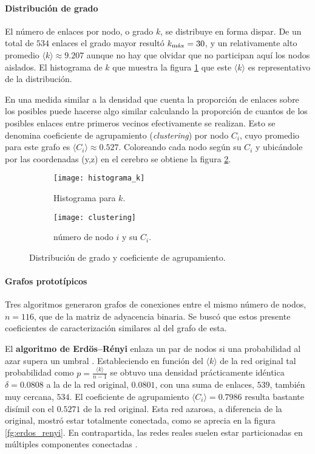 \documentclass{article}
\begin{document}
\paragraph{Distribución de grado}
El número de enlaces por nodo, o grado $k$, se distribuye en forma dispar.
De un total de $534$ enlaces el grado mayor resultó $k_\textnormal{máx} = 30$, y un relativamente alto promedio $\langle k \rangle \approx 9.207$ aunque no hay que olvidar que no participan aquí los nodos aislados.
El histograma de $k$ que muestra la figura \ref{fg:hist_k} que este $\langle k \rangle$ es representativo de la distribución.

En una medida similar a la densidad que cuenta la proporción de enlaces sobre los posibles puede hacerse algo similar calculando la proporción de cuantos de los posibles enlaces entre primeros vecinos efectivamente se realizan.
Esto se denomina coeficiente de agrupamiento (\emph{clustering}) por nodo $C_i$, cuyo promedio para este grafo es $\langle C_i \rangle \approx 0.527$. 
Coloreando cada nodo según su $C_i$ y ubicándole por las coordenadas (y,z) en el cerebro se obtiene la figura \ref{fg:clustering}. 

\begin{figure}[ht]
	\centering
	\begin{subfigure}[b]{0.25\textwidth}
		\texttt{[image: histograma\_k]}
		\caption{Histograma para $k$.
		}
		\label{fg:hist_k}
	\end{subfigure}
	\begin{subfigure}[b]{0.7\textwidth}
		\texttt{[image: clustering]}
		\caption{número de nodo $i$ y su $C_i$.
		}
		\label{fg:clustering}
	\end{subfigure}
	\caption{Distribución de grado y coeficiente de agrupamiento.
	}
	\label{fg:distribución_de_grado}
\end{figure}


\paragraph{Grafos prototípicos}
Tres algoritmos generaron grafos de conexiones entre el mismo número de nodos, $n = 116$, que de la matriz de adyacencia binaria.
Se buscó que estos presente coeficientes de caracterización similares al del grafo de esta.

El \textbf{algoritmo de Erdös–Rényi} enlaza un par de nodos si una probabilidad al azar supera un umbral \cite[sección 3.2]{albert-laszlo_barabasi_network_2016}.
Estableciendo en función del $\langle k \rangle$ de la red original tal probabilidad como $p = \frac{\langle k \rangle}{n -1}$ se obtuvo una densidad prácticamente idéntica $\delta = 0.0808$ a la de la red original, $0.0801$, con una suma de enlaces, $539$, también muy cercana, $534$. 
El coeficiente de agrupamiento $\langle C_i \rangle = 0.7986$ resulta bastante disímil con el $0.5271$ de la red original.
Esta red azarosa, a diferencia de la original, mostró estar totalmente conectada, como se aprecia en la figura \ref{fg:erdos_renyi}. 
En contrapartida, las redes reales suelen estar particionadas en múltiples componentes conectadas \cite[sección 3.7]{albert-laszlo_barabasi_network_2016}.
\end{document}
